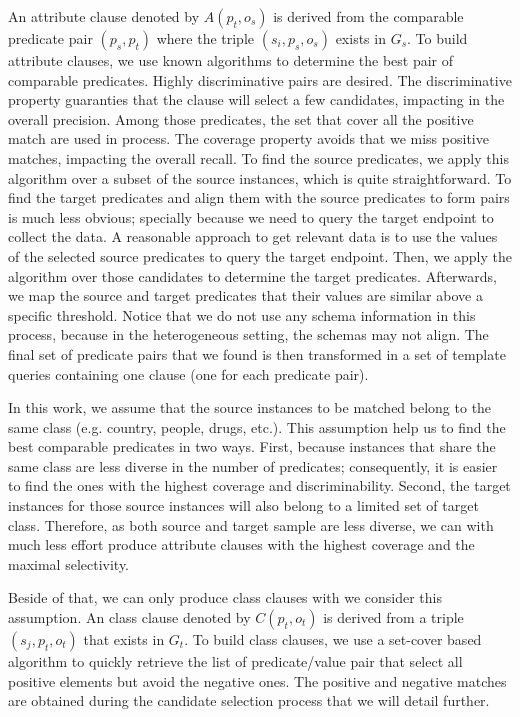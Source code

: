 An attribute clause denoted by $A(p_t,o_s)$ is derived from the comparable predicate pair $(p_s, p_t)$ where the triple $(s_i, p_s, o_s)$ exists in $G_s$. To build attribute clauses, we use known algorithms to determine the best pair of comparable predicates. Highly discriminative pairs are desired. The discriminative property guaranties that the clause will select a few candidates, impacting in the overall precision. Among those predicates, the set that cover all the positive match are used in process. The coverage property avoids that we miss positive matches, impacting the overall recall. To find the source predicates, we apply this algorithm over a subset of the source instances, which is quite straightforward. To find the target predicates and align them with the source predicates to form pairs is much less obvious; specially because we need to query the target endpoint to collect the data. A reasonable approach to get relevant data is to use the values of the selected source predicates to query the target endpoint. Then, we apply the algorithm over those candidates to determine the target predicates. Afterwards, we map the source and target predicates that their values are similar above a specific threshold. Notice that we do not use any schema information in this process, because in the heterogeneous setting, the schemas may not align. The final set of predicate pairs that we found is then transformed in a set of template queries containing one clause (one for each predicate pair).

In this work, we assume that the source instances to be matched belong to the same class (e.g. country, people, drugs, etc.). This assumption help us to find the best comparable predicates in two ways. First, because instances that share the same class are less diverse in the number of predicates; consequently, it is easier to find the ones with the highest coverage and discriminability. Second, the target instances for those source instances will also belong to a limited set of target class. Therefore, as both source and target sample are less diverse, we can with much less effort produce attribute clauses with the highest coverage and the maximal selectivity.

Beside of that, we can only produce class clauses with we consider this assumption. An class clause denoted by $C(p_t,o_t)$ is derived from a triple $(s_j, p_t, o_t)$ that exists in $G_t$. To build class clauses, we use a set-cover based algorithm \cite{DBLP:conf/soda/CarrDKM00} to quickly retrieve the list of predicate/value pair that select all positive elements but avoid the negative ones. The positive and negative matches are obtained during the candidate selection process that we will detail further.

